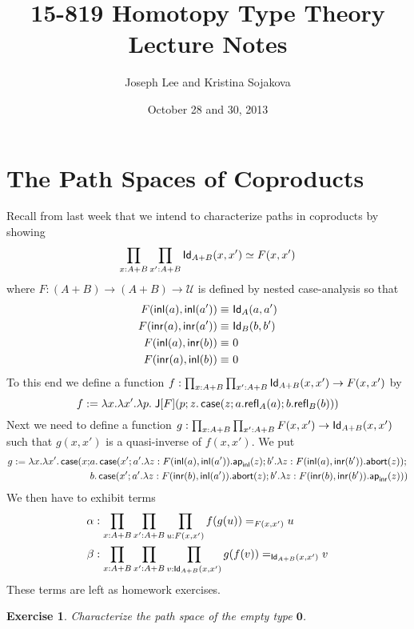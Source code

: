\documentclass[12pt]{article}
\newcommand{\ap}{\mathsf{ap}}
\newcommand{\abort}{\mathsf{abort}}
\newtheorem*{exercise}{Exercise}
\begin{document}
\title{15-819 Homotopy Type Theory Lecture Notes}
\author{Joseph Lee and Kristina Sojakova}
\date{October 28 and 30, 2013}

\maketitle

\section{The Path Spaces of Coproducts}\label{}

Recall from last week that we intend to characterize paths in coproducts by showing
\[ \prod_{x:A+B}\prod_{x':A+B} \mathsf{Id}_{A+B}(x,x') \simeq F(x,x') \]
where $F: (A+B) \to (A+B) \to \mathcal{U}$ is defined by nested case-analysis so that
\begin{align*}
 F({\mathsf{inl}}(a),{\mathsf{inl}}(a'))\equiv &\ \mathsf{Id}_{A}(a,a') \\
 F({\mathsf{inr}}(a),{\mathsf{inr}}(a'))\equiv &\ \mathsf{Id}_{B}(b,b') \\
 F({\mathsf{inl}}(a),{\mathsf{inr}}(b)) \equiv &\ 0 \\
 F({\mathsf{inr}}(a),{\mathsf{inl}}(b)) \equiv &\ 0
\end{align*}
To this end we define a function $f : \prod_{x:A+B}\prod_{x':A+B} \mathsf{Id}_{A+B}(x,x') \to F(x,x')$ by
\[
f := \lambda x.\lambda x'.\lambda p.\; \mathsf{J}[F](p;z.\operatorname{\textsf{case}}(z;a.\mathsf{refl}_{A}(a);b.\mathsf{refl}_{B}(b)))
\]
Next we need to define a function $g:\prod_{x:A+B}\prod_{x':A+B} F(x,x')\to\mathsf{Id}_{A+B}(x,x')$ such that $g(x,x')$ is a quasi-inverse of $f(x,x')$.
We put
{\small
\begin{align*}
g := \lambda x.\lambda x'.\case(x;&a.\case(x';a'.\lambda z:F(\inl(a),\inl(a')).\ap_{\inl}(z);b'.\lambda z:F(\inl(a),\inr(b')).\abort(z));\\
                                  &b.\case(x';a'.\lambda z:F(\inr(b),\inl(a')).\abort(z);b'.\lambda z:F(\inr(b),\inr(b')).\ap_{\inr}(z)))
\end{align*}}
We then have to exhibit terms
\begin{align*}
\alpha&:\prod_{x:A+B}\prod_{x':A+B}\prod_{u:F(x,x')}f(g(u)) =_{F(x,x')} u\\
\beta&:\prod_{x:A+B}\prod_{x':A+B}\prod_{v:\mathsf{Id}_{A+B}(x,x')}g(f(v)) =_{\mathsf{Id}_{A+B}(x,x')} v
\end{align*}
These terms are left as homework exercises.

\begin{exercise}
Characterize the path space of the empty type $\mathbf{0}$.
\end{exercise}
\end{document}
